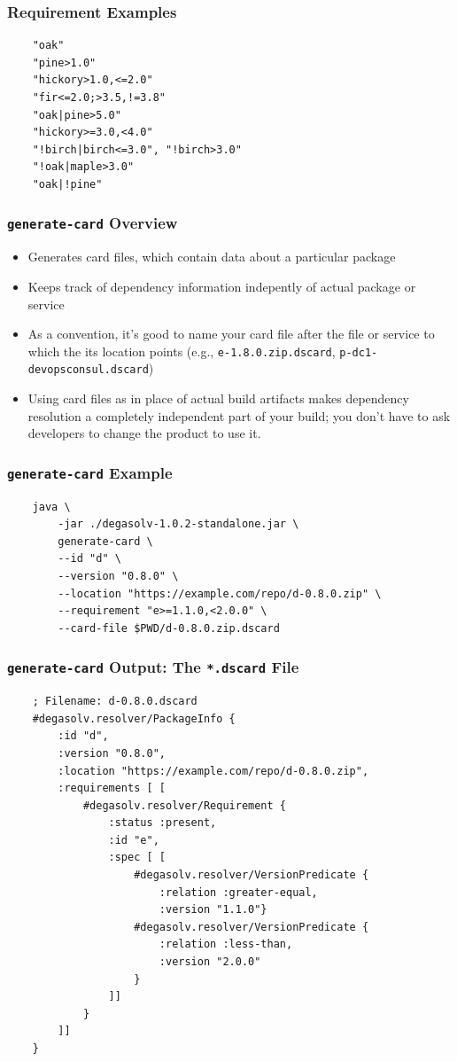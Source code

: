 \documentclass{beamer}
\begin{document}
\begin{frame}[fragile]
  \frametitle{Requirement Examples}
\begin{verbatim}
    "oak"
    "pine>1.0"
    "hickory>1.0,<=2.0"
    "fir<=2.0;>3.5,!=3.8"
    "oak|pine>5.0"
    "hickory>=3.0,<4.0"
    "!birch|birch<=3.0", "!birch>3.0"
    "!oak|maple>3.0"
    "oak|!pine"
\end{verbatim}
\end{frame}
\begin{frame}
  \frametitle{\texttt{generate-card} Overview}
  \begin{itemize}
  \item Generates card files, which contain data about a particular package
  \item Keeps track of dependency information indepently of actual package or
      service
  \item As a convention, it's good to name your card file after the file or
      service to which the its location points (e.g.,
          \texttt{e-1.8.0.zip.dscard}, \texttt{p-dc1-devopsconsul.dscard})
  \item Using card files as in place of actual build artifacts makes
    dependency resolution a completely independent part of your build; you
    don't have to ask developers to change the product to use it.
  \end{itemize}
\end{frame}
\begin{frame}[fragile]
  \frametitle{\texttt{generate-card} Example}
\begin{verbatim}
    java \
        -jar ./degasolv-1.0.2-standalone.jar \
        generate-card \
        --id "d" \
        --version "0.8.0" \
        --location "https://example.com/repo/d-0.8.0.zip" \
        --requirement "e>=1.1.0,<2.0.0" \
        --card-file $PWD/d-0.8.0.zip.dscard
\end{verbatim}
\end{frame}
\begin{frame}[fragile]
  \frametitle{\texttt{generate-card} Output: The \texttt{*.dscard} File}
\begin{verbatim}
    ; Filename: d-0.8.0.dscard
    #degasolv.resolver/PackageInfo {
        :id "d",
        :version "0.8.0",
        :location "https://example.com/repo/d-0.8.0.zip",
        :requirements [ [
            #degasolv.resolver/Requirement {
                :status :present,
                :id "e",
                :spec [ [
                    #degasolv.resolver/VersionPredicate {
                        :relation :greater-equal,
                        :version "1.1.0"}
                    #degasolv.resolver/VersionPredicate {
                        :relation :less-than,
                        :version "2.0.0"
                    }
                ]]
            }
        ]]
    }
\end{verbatim}
\end{frame}
\end{document}
